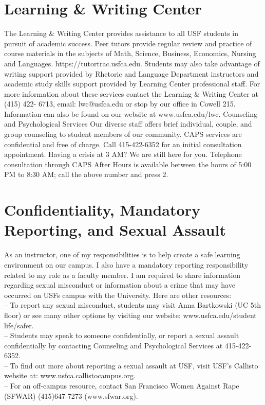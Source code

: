 \documentclass[10pt, oneside]{article}
\begin{document}
\section*{Learning \& Writing Center}
The Learning \& Writing Center provides assistance to all USF students in pursuit of academic success. Peer tutors provide regular review and practice of course materials in the subjects of Math, Science, Business, Economics, Nursing and Languages. https://tutortrac.usfca.edu. Students may also take advantage of writing support provided by Rhetoric and Language Department instructors and academic study skills support provided by Learning Center professional staff. For more information about these services contact the Learning \& Writing Center at (415) 422- 6713, email: lwc@usfca.edu or stop by our office in Cowell 215. Information can also be found on our website at www.usfca.edu/lwc.
Counseling and Psychological Services
Our diverse staff offers brief individual, couple, and group counseling to student members of our community. CAPS services are confidential and free of charge. Call 415-422-6352 for an initial consultation appointment. Having a crisis at 3 AM? We are still here for you. Telephone consultation through CAPS After Hours is available between the hours of 5:00 PM to 8:30 AM; call the above number and press 2.

\section*{Confidentiality, Mandatory Reporting, and Sexual Assault}

As an instructor, one of my responsibilities is to help create a safe learning environment on our campus. I also have a mandatory reporting responsibility related to my role as a faculty member. I am required to share information regarding sexual misconduct or information about a crime that may have occurred on USFs campus with the University. Here are other resources:\\
– To report any sexual misconduct, students may visit Anna Bartkowski (UC 5th floor) or see many other options by visiting our website: www.usfca.edu/student life/safer.\\
– Students may speak to someone confidentially, or report a sexual assault confidentially by contacting Counseling and Psychological Services at 415-422-6352.\\
– To find out more about reporting a sexual assault at USF, visit USF’s Callisto website at: www.usfca.callistocampus.org.\\
– For an off-campus resource, contact San Francisco Women Against Rape (SFWAR) (415)647-7273 (www.sfwar.org). \\
\end{document}
